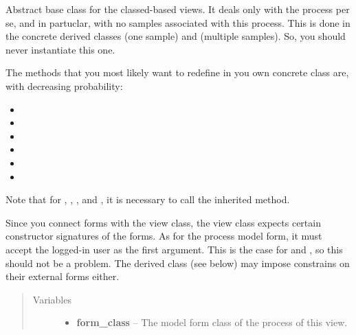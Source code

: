 \documentclass[a4paper,11pt,english]{sphinxmanual}
\begin{document}
\begin{fulllineitems}
\label{programming/class-based_views:samples.utils.views.class_views.ProcessWithoutSamplesView}
Abstract base class for the classed-based views.  It deals only with the
process per se, and in partuclar, with no samples associated with this
process.  This is done in the concrete derived classes
{\hyperref[programming/class-based_views:samples.utils.views.ProcessView]{}} (one sample) and
 (multiple samples).  So, you should
never instantiate this one.

The methods that you most likely want to redefine in you own concrete class
are, with decreasing probability:
\begin{itemize}
\item {} 

\item {} 

\item {} 

\item {} 

\item {} 

\item {} 

\end{itemize}

Note that for ,
, , and
, it is necessary to call the inherited method.

Since you connect forms with the view class, the view class expects certain
constructor signatures of the forms.  As for the process model form, it
must accept the logged-in user as the first argument.  This is the case for
{\hyperref[programming/utilities:samples.utils.views.ProcessForm]{}} and
{\hyperref[programming/utilities:samples.utils.views.DepositionForm]{}}, so this should not be a
problem.  The derived class (see below) may impose constrains on their
external forms either.
\begin{quote}\begin{description}
\item[{Variables}] \leavevmode\begin{itemize}
\item {} 
\textbf{form\_class} -- The model form class of the process of this view.


\end{itemize}
\end{description}
\end{quote}
\end{fulllineitems}
\end{document}
